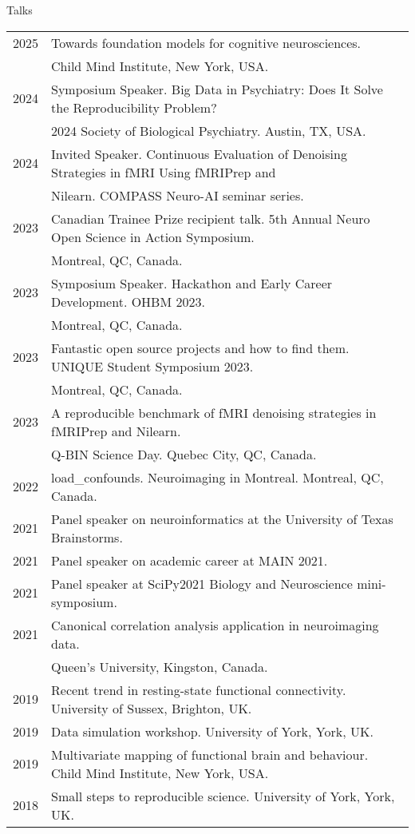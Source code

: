 \documentclass{resume} %
\begin{document}
\begin{rSection}{Talks}
  \begin{tabular}{@{} l l @{\hspace{10ex}}}
 	2025 & Towards foundation models for cognitive neurosciences. \\
 	&Child Mind Institute, New York, USA. \\
    2024 & Symposium Speaker. Big Data in Psychiatry: Does It Solve the Reproducibility Problem? \\ & 2024 Society of Biological Psychiatry. Austin, TX, USA.\\
    2024 & Invited Speaker. Continuous Evaluation of Denoising Strategies in fMRI Using fMRIPrep and\\
 	&Nilearn. COMPASS Neuro-AI seminar series.\\
    2023 & Canadian Trainee Prize recipient talk. 5th Annual Neuro Open Science in Action Symposium. \\ & Montreal, QC, Canada.\\
    2023 & Symposium Speaker. Hackathon and Early Career Development. OHBM 2023. \\&Montreal, QC, Canada.\\
    2023 & Fantastic open source projects and how to find them. UNIQUE Student Symposium 2023. \\&Montreal, QC, Canada.\\
    2023 & A reproducible benchmark of fMRI denoising strategies in fMRIPrep and Nilearn. \\ & Q-BIN Science Day. Quebec City, QC, Canada.\\
   	2022 & load\_confounds. Neuroimaging in Montreal. Montreal, QC, Canada.\\
    2021 & Panel speaker on neuroinformatics at the University of Texas Brainstorms.\\
    2021 & Panel speaker on academic career at MAIN 2021. \\
    2021 & Panel speaker at SciPy2021 Biology and Neuroscience mini-symposium. \\
  	2021 & Canonical correlation analysis application in neuroimaging data. \\&Queen's University, Kingston, Canada. \\
    2019 & Recent trend in resting-state functional connectivity. University of Sussex, Brighton, UK. \\
    2019 & Data simulation workshop. University of York, York, UK. \\
    2019 & Multivariate mapping of functional brain and behaviour. Child Mind Institute, New York, USA. \\
    2018 & Small steps to reproducible science. University of York, York, UK. \\
  \end{tabular}
\end{rSection}
\end{document}
